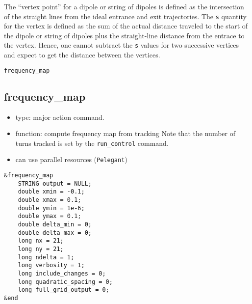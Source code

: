 \documentclass[11pt]{article}
\begin{document}
The ``vertex  point'' for a dipole or string of dipoles is defined as the intersection of the
straight lines from the ideal entrance and exit trajectories. 
The \verb|s| quantity for the vertex is defined as the sum of the actual distance traveled to the
start of the dipole or string of dipoles plus the straight-line distance from the entrace to the
vertex. 
Hence, one cannot subtract the \verb|s| values for two successive vertices and expect to get the
distance between the vertices.

\newpage
\begin{center}{\Large\verb|frequency_map|}\end{center}
\subsection{frequency\_map \label{subsec:frequencymap}}

\begin{itemize}
\item type: major action command.  
\item function: compute frequency map from tracking
      Note that the number of turns tracked is set by the \verb|run_control| command.
\item can use parallel resources (\verb|Pelegant|)
\end{itemize}

\begin{verbatim}
&frequency_map
    STRING output = NULL;
    double xmin = -0.1;
    double xmax = 0.1;
    double ymin = 1e-6;
    double ymax = 0.1;
    double delta_min = 0;
    double delta_max = 0;
    long nx = 21;
    long ny = 21;
    long ndelta = 1;
    long verbosity = 1;
    long include_changes = 0;
    long quadratic_spacing = 0;
    long full_grid_output = 0;
&end
\end{verbatim}
\end{document}
